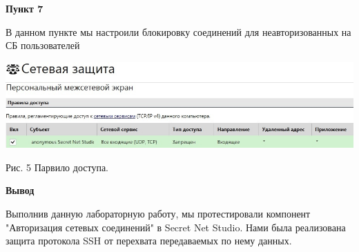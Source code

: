 \documentclass[a4paper,14pt]{extarticle}
\begin{document}
    \textbf{Пункт 7}
    \vspace{-3ex}
    \begin{center}
        \singlespacing
        В данном пункте мы настроили блокировку соединений для неавторизованных на СБ пользователей

        \includegraphics[scale=0.5]{pics/7.jpg}

        Рис. 5 Парвило доступа.
    \end{center}

    \textbf{Вывод}\par
    Выполнив данную лабораторную работу, мы протестировали компонент "Авторизация сетевых соединений" в Secret Net Studio. 
    Нами была реализована защита протокола SSH от перехвата передаваемых по нему данных. 
\end{document}
